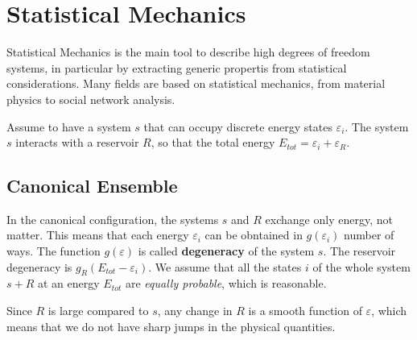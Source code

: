 \documentclass[12pt,a4paper]{article}
\begin{document}
\section{Statistical Mechanics}
Statistical Mechanics is the main tool to describe high degrees of freedom systems, in particular by extracting generic propertis from statistical considerations.
Many fields are based on statistical mechanics, from material physics to social network analysis.

Assume to have a system $s$ that can occupy discrete energy states $\varepsilon_i$. The system $s$ interacts with a reservoir $R$, so that the total energy $E_{tot} = \varepsilon_i + \varepsilon_R$. 

\subsection{Canonical Ensemble}
In the canonical configuration, the systems $s$ and $R$ exchange only energy, not matter. This means that each energy $\varepsilon_i$ can be obntained in $g(\varepsilon_i)$ number of ways. The function $g(\varepsilon)$ is called \textbf{degeneracy} of the system $s$. The reservoir degeneracy is $g_R(E_{tot}-\varepsilon_i)$. We assume that all the states $i$ of the whole system $s+R$ at an energy $E_{tot}$ are \textit{equally probable}, which is reasonable.

Since $R$ is large compared to $s$, any change in $R$ is a smooth function of $\varepsilon$, which means that we do not have sharp jumps in the physical quantities.
\end{document}

